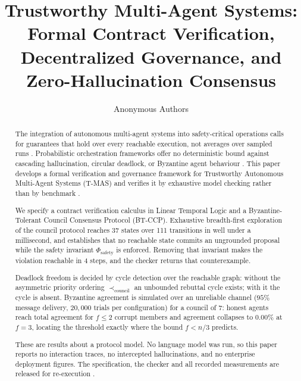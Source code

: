 \documentclass{article}
\begin{document}
\title{Trustworthy Multi-Agent Systems: Formal Contract Verification, Decentralized Governance, and Zero-Hallucination Consensus}
\author{Anonymous Authors}
\maketitle

\begin{abstract}
The integration of autonomous multi-agent systems into safety-critical operations calls for guarantees that hold over every reachable execution, not averages over sampled runs \cite{arxiv_2005_14165,arxiv_2203_02155}. Probabilistic orchestration frameworks offer no deterministic bound against cascading hallucination, circular deadlock, or Byzantine agent behaviour \cite{arxiv_2312_03893,arxiv_2406_00584}. This paper develops a formal verification and governance framework for Trustworthy Autonomous Multi-Agent Systems (T-MAS) and verifies it by exhaustive model checking rather than by benchmark \cite{crossref_10_1109_access_2026_3656309}.

We specify a contract verification calculus in Linear Temporal Logic and a Byzantine-Tolerant Council Consensus Protocol (BT-CCP). Exhaustive breadth-first exploration of the council protocol reaches 37 states over 111 transitions in well under a millisecond, and establishes that no reachable state commits an ungrounded proposal while the safety invariant $\Phi_{\text{safety}}$ is enforced. Removing that invariant makes the violation reachable in 4 steps, and the checker returns that counterexample.

Deadlock freedom is decided by cycle detection over the reachable graph: without the asymmetric priority ordering $\prec_{\text{council}}$ an unbounded rebuttal cycle exists; with it the cycle is absent. Byzantine agreement is simulated over an unreliable channel ($95\%$ message delivery, $20{,}000$ trials per configuration) for a council of $7$: honest agents reach total agreement for $f \le 2$ corrupt members and agreement collapses to $0.00\%$ at $f = 3$, locating the threshold exactly where the bound $f < n/3$ predicts.

These are results about a protocol model. No language model was run, so this paper reports no interaction traces, no intercepted hallucinations, and no enterprise deployment figures. The specification, the checker and all recorded measurements are released for re-execution \cite{arxiv_2501_02497,crossref_10_1201_9788743808145_14}.
\end{abstract}
\end{document}
